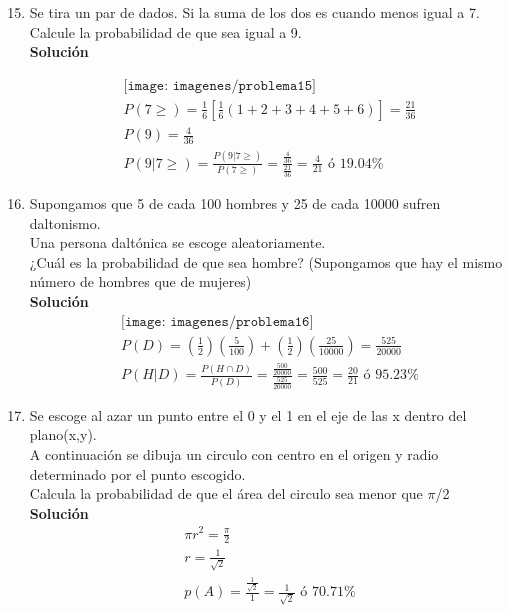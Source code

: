 \begin{enumerate}
	\setcounter{enumi}{14} 
	\item Se tira un par de dados. Si la suma de los dos es cuando menos igual a 7. Calcule la probabilidad de que sea igual a 9.
    \\\textbf{Solución}
    
    \begin{gather*}
    \texttt{[image: imagenes/problema15]}\\
       P(7\geq) = \frac{1}{6}[\frac{1}{6}(1+2+3+4+5+6)]=\frac{21}{36}\\
        P(9) = \frac{4}{36}\\
        P(9|7\geq) = \frac{P(9|7\geq)}{P(7\geq)} = \frac{\frac{4}{36}}{\frac{21}{36}} = \frac{4}{21}\text{ ó } 19.04\%
    \end{gather*}
	\item Supongamos que 5 de cada 100 hombres y 25 de cada 10000 sufren daltonismo.\\
	Una persona daltónica se escoge aleatoriamente.\\
	¿Cuál es la probabilidad de que sea hombre? (Supongamos que hay el mismo número de hombres que de mujeres)
    \\\textbf{Solución}
      \begin{gather*}
        \texttt{[image: imagenes/problema16]}\\
           P(D) = (\frac{1}{2})(\frac{5}{100})+(\frac{1}{2})(\frac{25}{10000})=\frac{525}{20000}\\
            P(H|D) = \frac{P(H \cap D)}{P(D)} = \frac{\frac{500}{20000}}{\frac{525}{20000}} = \frac{500}{525} = \frac{20}{21} \text{ ó } 95.23\%
    \end{gather*}
	\item Se escoge al azar un punto entre el 0 y el 1 en el eje de las x dentro del plano(x,y).\\A continuación se dibuja un circulo con centro en el origen y radio determinado por el punto escogido.\\Calcula la probabilidad de que el área del circulo sea menor que $\pi$/2
    \\\textbf{Solución}
    \begin{gather*}
        \pi r^{2}=\frac{\pi}{2}\\
        r=\frac{1}{\sqrt{2}}\\
        p(A) = \frac{\frac{1}{\sqrt{2}}}{1}=\frac{1}{\sqrt{2}} \text{ ó } 70.71\%
    \end{gather*}

\end{enumerate}
